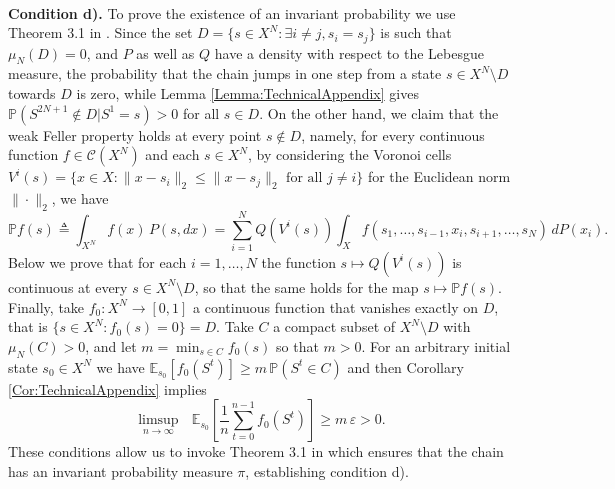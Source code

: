 \documentclass[12pt,english]{article}
\begin{document}
{\\[1ex]
{\bf Condition d).} To prove the existence of an invariant probability we use Theorem 3.1 in \cite{lasserre2000invariant}.  
Since the set $D=\{s \in X^N: \exists i\neq j, s_i=s_j\}$ is such that $\mu_N(D)=0$, and $P$ as well as $Q$ have a density with respect to the Lebesgue measure, the probability that the chain jumps in one step from a state $s\in X^N\setminus D$ towards $D$ is zero, while Lemma \ref{Lemma:TechnicalAppendix}
gives $\mathbb{P}(S^{2N+1}\not\in D|S^1=s)>0$ for all $s\in D$. On the other hand, we claim that the weak Feller property holds at every point $s\not\in D$, namely, for every continuous function $f\in\mathcal{C}(X^N)$ and each $s\in X^N$, by considering the Voronoi cells
$V^i(s)=\{x\in X:\|x-s_i\|_2\leq \|x-s_j\|_2\mbox{ for all }j\neq i\}$ for the Euclidean norm $\|\cdot\|_2$, we have $$\mathbb{P}f(s)\triangleq \int_{X^N} f(x) \,P(s,dx)=\sum_{i=1}^N Q(V^i(s))\int_X f(s_1,\ldots,s_{i-1},x_i,s_{i+1},\ldots,s_N)\,dP(x_i).$$
Below we prove that for each $i=1,\ldots,N$ the function $s\mapsto Q(V^i(s))$ is continuous at every $s\in X^N\setminus D$, so that the same holds for the 
map $s\mapsto \mathbb{P}f(s)$.
Finally, take  $f_0:X^N\to [0,1]$ a continuous function that vanishes exactly on $D$, that is $\{s\in X^N:f_0(s)=0\}=D$.
Take $C$ a compact subset of $X^N\setminus D$ with $\mu_N(C)>0$, and let $m=\min_{s\in C}f_0(s)$ so that $m>0$.
For an arbitrary initial state $s_0\in X^N$ we have $\mathbb{E}_{s_0}[f_0(S^t)]\geq m\,\mathbb{P}(S^t\in C)$ and then Corollary \ref{Cor:TechnicalAppendix} implies 
$$\limsup_{n\to\infty} \mbox{ $\mathbb{E}_{s_0}[\frac{1}{n}\sum_{t=0}^{n-1}f_0(S^t)]$}\geq m\,\varepsilon>0.$$
These conditions allow us to invoke Theorem 3.1 in \cite{lasserre2000invariant}
which ensures that the chain has an invariant probability measure $\pi$, establishing condition d).

}
\end{document}
